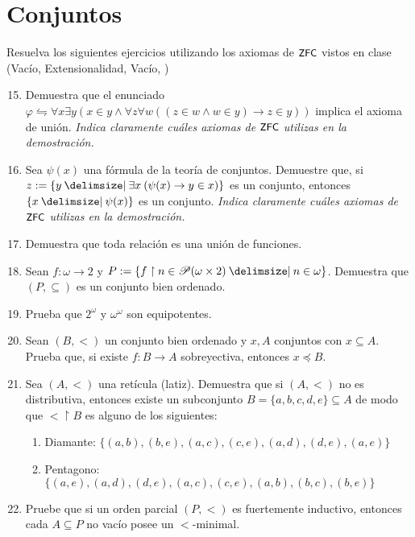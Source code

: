 \documentclass[11pt]{article}
\providecommand\st{\;|\;}
\newcommand\SetSymbol[1][]{%
    \nonscript\:#1\vert
    \allowbreak
    \nonscript\:
    \mathopen{}}
\renewcommand\st{\SetSymbol[\delimsize]}
\renewcommand\st{\SetSymbol[\delimsize]}
\newcommand{\zfc}{\text{\textsf{\small ZFC}}}
\begin{document}
    \section*{Conjuntos}
    Resuelva los siguientes ejercicios utilizando los axiomas de $\zfc$ vistos en clase (Vacío, Extensionalidad, Vacío, )
    \begin{enumerate}[\bf\text{Ej.} 1.]
    \setcounter{enumi}{14}
    \item Demuestra que el enunciado $\varphi \leftrightharpoons \forall x\exists y (x\in y \wedge \forall z \forall w ((z\in w \wedge w\in y) \rightarrow z\in y))$ implica el axioma de unión.
    \textit{Indica claramente cuáles axiomas de $\zfc$ utilizas en la demostración.}

    \item Sea $\psi(x)$ una fórmula de la teoría de conjuntos. Demuestre que, si $z:=\{ y \st \exists x \: (\psi(x) \to y \in x) \}$ es un conjunto, entonces $\{x \st \psi(x)\}$ es un conjunto.
    \textit{Indica claramente cuáles axiomas de $\zfc$ utilizas en la demostración.}

   
    \item Demuestra que toda relación es una unión de funciones.
    \item Sean $f:\omega \to 2$ y $P:=\{ f \upharpoonright n \in \mathscr{P}(\omega \times 2) \st n \in \omega \}$. Demuestra que $(P,\subseteq)$ es un conjunto bien ordenado.
    

    \item Prueba que $2^\omega$ y $\omega ^ \omega$ son equipotentes.
    
    \item Sean $(B,<)$ un conjunto bien ordenado y $x,A$ conjuntos con $x \subseteq A$. Prueba que, si existe $f:B \to A$ sobreyectiva, entonces $x \preccurlyeq B$.
    

    \item Sea $(A,<)$ una retícula (latiz). Demuestra que si $(A,<)$ no es distributiva, entonces existe un subconjunto $B=\{a,b,c,d,e\} \subseteq A$ de modo que $< \upharpoonright B$ es alguno de los siguientes:
    \begin{enumerate}
        \item Diamante: $\{(a,b),(b,e),(a,c),(c,e),(a,d),(d,e),(a,e)\}$
        \item Pentagono: $\{(a,e),(a,d),(d,e),(a,c),(c,e),(a,b),(b,c),(b,e)\}$
    \end{enumerate}

    \item Pruebe que si un orden parcial $(P,<)$ es fuertemente inductivo, entonces cada $A \subseteq P$ no vacío posee un $<$-minimal.
    

\end{enumerate}
\end{document}
